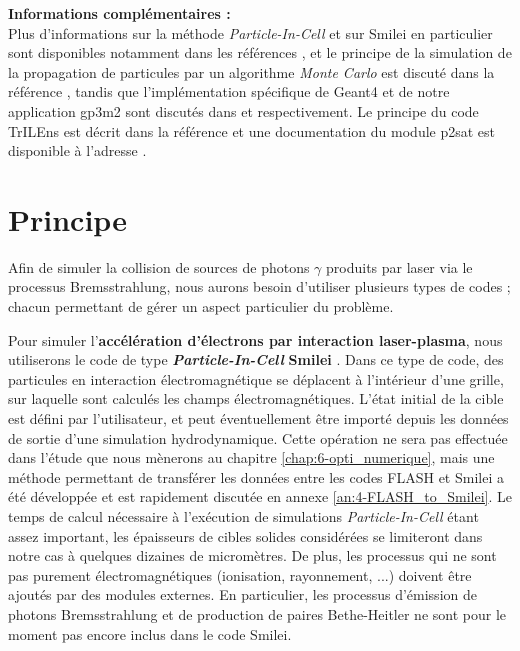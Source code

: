 \begin{refsection}
{\begin{minipage}{\textwidth}
    \medskip
    \textbf{Informations complémentaires :}\\
    Plus d'informations sur la méthode \textit{Particle-In-Cell} et sur Smilei en particulier sont disponibles notamment dans les références \parencite{tskhakaya_2007, nuter_2014, derouillat_2018}, et le principe de la simulation de la propagation de particules par un algorithme \textit{Monte Carlo} est discuté dans la référence \parencite{haghighat_2015}, tandis que l'implémentation spécifique de Geant4 et de notre application gp3m2 sont discutés dans \parencite{agostinelli_2003, geant4_physref} et \parencite{gp3m2} respectivement. Le principe du code TrILEns est décrit dans la référence \parencite{jansen_2018} et une documentation du module p2sat est disponible à l'adresse \parencite{p2sat}.
\end{minipage}}
\newpage

\section{Principe}

Afin de simuler la collision de sources de photons $\gamma$ produits par laser via le processus Bremsstrahlung, nous aurons besoin d'utiliser plusieurs types de codes ; chacun permettant de gérer un aspect particulier du problème.

Pour simuler l'\textbf{accélération d'électrons par interaction laser-plasma}, nous utiliserons le code de type \textbf{\textit{Particle-In-Cell}} \textbf{Smilei} \parencite{derouillat_2018}. 
Dans ce type de code, des particules en interaction électromagnétique se déplacent à l'intérieur d'une grille, sur laquelle sont calculés les champs électromagnétiques. L'état initial de la cible est défini par l'utilisateur, et peut éventuellement être importé depuis les données de sortie d'une simulation hydrodynamique. Cette opération ne sera pas effectuée dans l'étude que nous mènerons au chapitre \ref{chap:6-opti_numerique}, mais une méthode permettant de transférer les données entre les codes FLASH \parencite{fryxell_2000} et Smilei a été développée et est rapidement discutée en annexe \ref{an:4-FLASH_to_Smilei}. Le temps de calcul nécessaire à l’exécution de simulations \textit{Particle-In-Cell} étant assez important, les épaisseurs de cibles solides considérées se limiteront dans notre cas à quelques dizaines de micromètres. De plus, les processus qui ne sont pas purement électromagnétiques (ionisation, rayonnement, ...) doivent être ajoutés par des modules externes. En particulier, les processus d'émission de photons Bremsstrahlung et de production de paires Bethe-Heitler ne sont pour le moment pas encore inclus dans le code Smilei.


\end{refsection}
